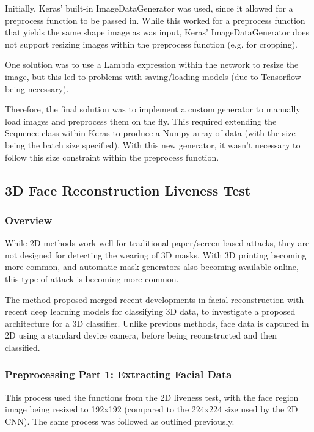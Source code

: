 \documentclass[12pt,a4paper]{article}
\begin{document}
                Initially, Keras' built-in ImageDataGenerator was used, since it allowed for a preprocess function to be passed in. While this worked for a preprocess function that yields the same shape image
                as was input, Keras' ImageDataGenerator does not support resizing images within the preprocess function (e.g. for cropping).

                One solution was to use a Lambda expression within the network to resize the image, but this led to problems with saving/loading models (due to Tensorflow being necessary).

                Therefore, the final solution was to implement a custom generator to manually load images and preprocess them on the fly. This required extending the Sequence class within Keras to produce a Numpy array of data (with the size being the batch size specified). With this new generator, it wasn't necessary to follow this size constraint within the preprocess function. 


    \subsection{3D Face Reconstruction Liveness Test}
        \subsubsection{Overview}
        While 2D methods work well for traditional paper/screen based attacks, they are not designed for detecting the wearing of 3D masks. With 3D printing
        becoming more common, and automatic mask generators also becoming available online, this type of attack is becoming more common.

        The method proposed merged recent developments in facial reconstruction with recent deep learning models for classifying 3D data, to investigate a proposed architecture for a 3D classifier. Unlike previous methods, face data is captured in 2D using a standard device camera, before being reconstructed and then classified.

        \subsubsection{Preprocessing Part 1: Extracting Facial Data}
            This process used the functions from the 2D liveness test, with the face region image being resized to 192x192 (compared to the 224x224 size used by the 2D CNN).
            The same process was followed as outlined previously.
\end{document}

